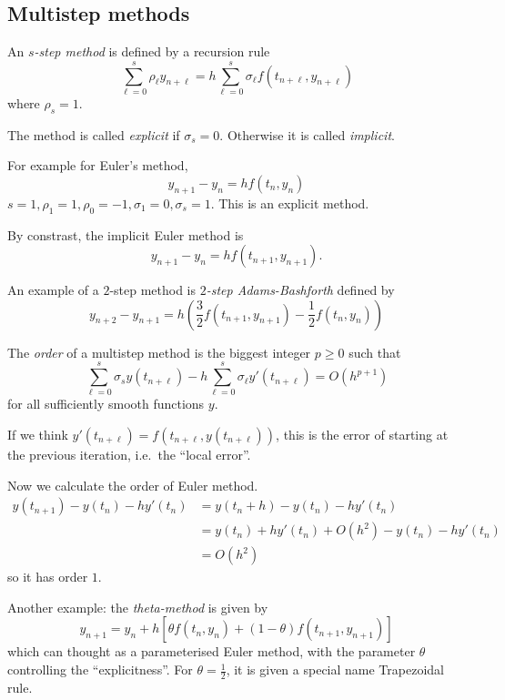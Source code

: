 \documentclass[a4paper]{article}
\begin{document}
\subsection{Multistep methods}

An \emph{\(s\)-step method} is defined by a recursion rule
\[
  \sum_{\ell = 0}^s \rho_\ell y_{n + \ell} = h \sum_{\ell = 0}^s \sigma_\ell f(t_{n + \ell}, y_{n + \ell})
\]
where \(\rho_s = 1\).

The method is called \emph{explicit} if \(\sigma_s = 0\). Otherwise it is called \emph{implicit}.

For example for Euler's method,
\[
  y_{n + 1} - y_n = hf(t_n, y_n)
\]
\(s = 1, \rho_1 = 1, \rho_0 = -1, \sigma_1 = 0, \sigma_s = 1\).
This is an explicit method.

By constrast, the implicit Euler method is
\[
  y_{n + 1} - y_n = hf(t_{n + 1}, y_{n + 1}).
\]

An example of a \(2\)-step method is \emph{\(2\)-step Adams-Bashforth} defined by
\[
  y_{n + 2} - y_{n + 1} = h \left( \frac{3}{2}f(t_{n + 1}, y_{n + 1}) - \frac{1}{2}f(t_n, y_n) \right)
\]

\begin{definition}[Order]
  The \emph{order} of a multistep method is the biggest integer \(p \geq 0\) such that
  \[
    \sum_{\ell = 0}^s \sigma_s y(t_{n + \ell}) - h \sum_{\ell = 0}^s \sigma_\ell y'(t_{n + \ell}) = O(h^{p + 1})
  \]
  for all sufficiently smooth functions \(y\).
\end{definition}

If we think \(y'(t_{n + \ell}) = f(t_{n + \ell}, y(t_{n + \ell}))\), this is the error of starting at the previous iteration, i.e.\ the ``local error''.

Now we calculate the order of Euler method.
\begin{align*}
  y(t_{n + 1}) - y(t_n) - hy'(t_n)
  &= y(t_n + h) - y(t_n) - hy'(t_n) \\
  &= y(t_n) + hy'(t_n) + O(h^2) - y(t_n) -hy'(t_n) \\
  &= O(h^2)
\end{align*}
so it has order \(1\).

Another example: the \emph{theta-method} is given by
\[
  y_{n + 1} = y_n + h[\theta f(t_n, y_n) + (1 - \theta) f(t_{n + 1}, y_{n + 1})]
\]
which can thought as a parameterised Euler method, with the parameter \(\theta\) controlling the ``explicitness''. For \(\theta = \frac{1}{2}\), it is given a special name Trapezoidal rule.
\end{document}
